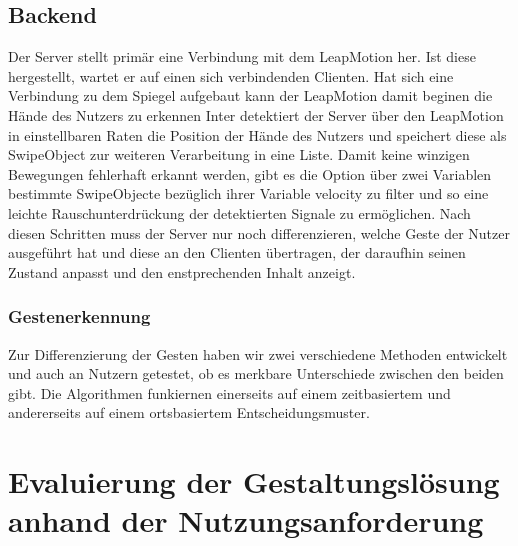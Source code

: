 \documentclass[12pt, a4paper]{scrartcl}
\begin{document}
	\subsection{Backend}
	Der Server stellt primär eine Verbindung mit dem LeapMotion her. Ist diese hergestellt, wartet er auf einen sich verbindenden Clienten. Hat sich eine Verbindung zu dem Spiegel aufgebaut kann der LeapMotion damit beginen die Hände des Nutzers zu erkennen
	Inter detektiert der Server über den LeapMotion in einstellbaren Raten die Position der Hände des Nutzers und speichert diese als SwipeObject zur weiteren Verarbeitung in eine Liste. Damit keine winzigen Bewegungen fehlerhaft erkannt werden, gibt es die Option über zwei Variablen bestimmte SwipeObjecte bezüglich ihrer Variable velocity zu filter und so eine leichte Rauschunterdrückung der detektierten Signale zu ermöglichen.
	Nach diesen Schritten muss der Server nur noch differenzieren, welche Geste der Nutzer ausgeführt hat und diese an den Clienten übertragen, der daraufhin seinen Zustand anpasst und den enstprechenden Inhalt anzeigt. 
	\subsubsection*{Gestenerkennung}
	Zur Differenzierung der Gesten haben wir zwei verschiedene Methoden entwickelt und auch an Nutzern getestet, ob es merkbare Unterschiede zwischen den beiden gibt.
	Die Algorithmen funkiernen einerseits auf einem zeitbasiertem und andererseits auf einem ortsbasiertem Entscheidungsmuster.
	
	\newpage
	
	\section{Evaluierung der Gestaltungslösung anhand der Nutzungsanforderung}
\end{document}
